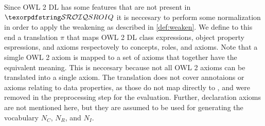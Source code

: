 
Since OWL 2 DL has some features that are not present in $\SROIQ$ it is neccesary to perform some normalization in order to apply the weakening as described in \cref{def:weaken}. We define to this end a translation $\pi$ that maps OWL 2 DL class expressions, object property espressions, and axioms respectovely to \SROIQ concepts, roles, and axioms. Note that a simgle OWL 2 axiom is mapped to a set of \SROIQ axioms that together have the equivalent meaning. This is neccesary because not all OWL 2 axioms can be translated into a single \SROIQ axiom. The translation does not cover annotaions or axioms relating to data properties, as those do not map directly to \SROIQ, and were removed in the preprocessing step for the evaluation. Further, declaration axioms are not mentioned here, but they are assumed to be used for generating the vocabulary $N_C$, $N_R$, and $N_I$.

